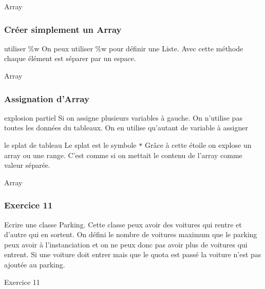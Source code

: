 \documentclass{beamer}
\begin{document}
\begin{frame}
  \begin{beamerboxesrounded}{Array}
    
  \end{beamerboxesrounded}
\end{frame}

\begin{frame}
  \frametitle{Cr\'eer simplement un Array}
  \begin{block}{utiliser \%w}
    On peux utiliser \%w pour d\'efinir une Liste. Avec cette m\'ethode
    chaque \'el\'ement est s\'eparer par un espace.
  \end{block}
\end{frame}

\begin{frame}
  \begin{beamerboxesrounded}{Array}
    
  \end{beamerboxesrounded}
\end{frame}

\begin{frame}
  \frametitle{Assignation d'Array}
  \begin{block}{explosion partiel}
    Si on assigne plusieurs variables à gauche. On n'utilise pas toutes les donn\'ees
    du tableaux. On en utilise qu'autant de variable à assigner
  \end{block}
  \begin{block}{le splat de tableau}
    Le splat est le symbole \verb?*? Gr\^ace à cette \'etoile on explose
    un array ou une range. C'est comme si on mettait le contenu de l'array comme
    valeur s\'epar\'ee.
  \end{block}
\end{frame}

\begin{frame}
  \begin{beamerboxesrounded}{Array}
    
  \end{beamerboxesrounded}
\end{frame}


\begin{frame}
  \frametitle{Exercice 11}
  Ecrire une classe Parking. Cette classe peux avoir des voitures qui rentre
  et d'autre qui en sortent. On d\'efini le nombre de voitures maximum que le parking
  peux avoir à l'instanciation et on ne peux donc pas avoir plus de voitures qui entrent.
  Si une voiture doit entrer mais que le quota est pass\'e la voiture n'est pas ajout\'ee au
  parking.
\end{frame}
\begin{frame}
  \begin{beamerboxesrounded}{Exercice 11}
    
  \end{beamerboxesrounded}
\end{frame}
\end{document}
